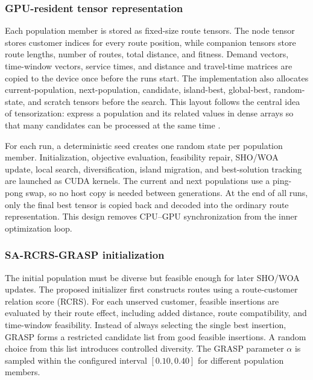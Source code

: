 \documentclass[pdflatex,sn-mathphys-num]{sn-jnl}
\begin{document}
\subsubsection{GPU-resident tensor representation}

Each population member is stored as fixed-size route tensors. The node tensor stores customer indices for every route position, while companion tensors store route lengths, number of routes, total distance, and fitness. Demand vectors, time-window vectors, service times, and distance and travel-time matrices are copied to the device once before the runs start. The implementation also allocates current-population, next-population, candidate, island-best, global-best, random-state, and scratch tensors before the search. This layout follows the central idea of tensorization: express a population and its related values in dense arrays so that many candidates can be processed at the same time \cite{liang2026tensorization}.

For each run, a deterministic seed creates one random state per population member. Initialization, objective evaluation, feasibility repair, SHO/WOA update, local search, diversification, island migration, and best-solution tracking are launched as CUDA kernels. The current and next populations use a ping-pong swap, so no host copy is needed between generations. At the end of all runs, only the final best tensor is copied back and decoded into the ordinary route representation. This design removes CPU--GPU synchronization from the inner optimization loop.

\subsubsection{SA-RCRS-GRASP initialization}

The initial population must be diverse but feasible enough for later SHO/WOA updates. The proposed initializer first constructs routes using a route-customer relation score (RCRS). For each unserved customer, feasible insertions are evaluated by their route effect, including added distance, route compatibility, and time-window feasibility. Instead of always selecting the single best insertion, GRASP forms a restricted candidate list from good feasible insertions. A random choice from this list introduces controlled diversity. The GRASP parameter $\alpha$ is sampled within the configured interval $[0.10,0.40]$ for different population members.
\end{document}
